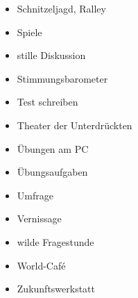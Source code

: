 \begin{itemize}
  \item Schnitzeljagd, Ralley
  \item Spiele
  \item stille Diskussion
  \item Stimmungsbarometer
  \item Test schreiben
  \item Theater der Unterdrückten
  \item Übungen am PC
  \item Übungsaufgaben
  \item Umfrage
  \item Vernissage
  \item wilde Fragestunde
  \item World-Café
  \item Zukunftswerkstatt
\end{itemize}

\onecolumn

